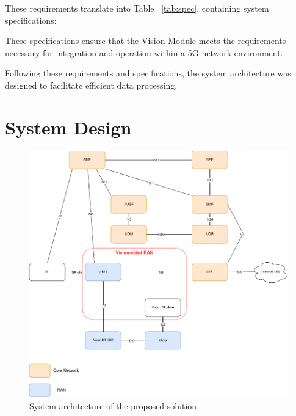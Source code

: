 These requirements translate into Table ~\ref{tab:spec}, containing system specifications:

\begin{table}[H]
\caption{System specifications.}
\label{tab:spec}
\centering
{}
\end{table}

These specifications ensure that the Vision Module meets the requirements necessary for integration and operation within a 5G network environment.


Following these requirements and specifications, the system architecture was designed to facilitate efficient data processing.

\section{System Design}\label{sec:design}

\begin{figure}[H]
    \centering
    \includegraphics[width=0.7\linewidth]{figures/Syst_Arch.drawio}
    \caption[System architecture of the proposed solution]{System architecture of the proposed solution}
    \label{fig:my_arch}
\end{figure}

